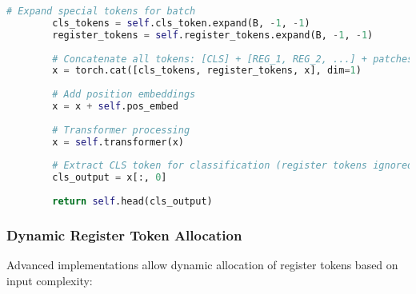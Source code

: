 \begin{lstlisting}[language=Python, caption=Register token integration in Vision Transformer]
        # Expand special tokens for batch
        cls_tokens = self.cls_token.expand(B, -1, -1)
        register_tokens = self.register_tokens.expand(B, -1, -1)
        
        # Concatenate all tokens: [CLS] + [REG_1, REG_2, ...] + patches
        x = torch.cat([cls_tokens, register_tokens, x], dim=1)
        
        # Add position embeddings
        x = x + self.pos_embed
        
        # Transformer processing
        x = self.transformer(x)
        
        # Extract CLS token for classification (register tokens ignored)
        cls_output = x[:, 0]
        
        return self.head(cls_output)
\end{lstlisting}

\subsubsection{Dynamic Register Token Allocation}

Advanced implementations allow dynamic allocation of register tokens based on input complexity:

